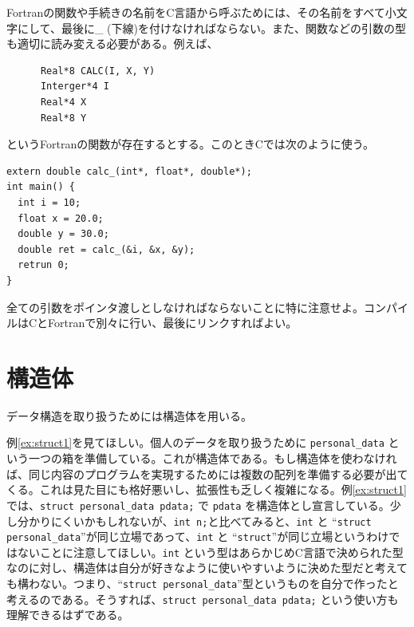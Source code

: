 Fortranの関数や手続きの名前をC言語から呼ぶためには、その名前をすべて小文字にして、最後に\_ (下線)を付けなければならない。また、関数などの引数の型も適切に読み変える必要がある。例えば、
\begin{reidai}
\begin{verbatim}
      Real*8 CALC(I, X, Y)
      Interger*4 I
      Real*4 X
      Real*8 Y
\end{verbatim}
\end{reidai} \noindent
というFortranの関数が存在するとする。このときCでは次のように使う。
\begin{reidai}
\begin{verbatim}
extern double calc_(int*, float*, double*);
int main() {
  int i = 10;
  float x = 20.0;
  double y = 30.0;
  double ret = calc_(&i, &x, &y);
  retrun 0;
}
\end{verbatim}
\end{reidai} \noindent
全ての引数をポインタ渡しとしなければならないことに特に注意せよ。コンパイルはCとFortranで別々に行い、最後にリンクすればよい。

\section{構造体}
データ構造を取り扱うためには構造体を用いる。

例\ref{ex:struct1}を見てほしい。個人のデータを取り扱うために \verb|personal_data| という一つの箱を準備している。これが構造体である。もし構造体を使わなければ、同じ内容のプログラムを実現するためには複数の配列を準備する必要が出てくる。これは見た目にも格好悪いし、拡張性も乏しく複雑になる。例\ref{ex:struct1}では、\verb|struct personal_data pdata;| で \verb|pdata| を構造体とし宣言している。少し分かりにくいかもしれないが、\verb|int n;|と比べてみると、\verb|int| と ``\verb|struct personal_data|''が同じ立場であって、\verb|int| と ``\verb|struct|''が同じ立場というわけではないことに注意してほしい。\verb|int| という型はあらかじめC言語で決められた型なのに対し、構造体は自分が好きなように使いやすいように決めた型だと考えても構わない。つまり、``\verb|struct personal_data|''型というものを自分で作ったと考えるのである。そうすれば、\verb|struct personal_data pdata;| という使い方も理解できるはずである。

